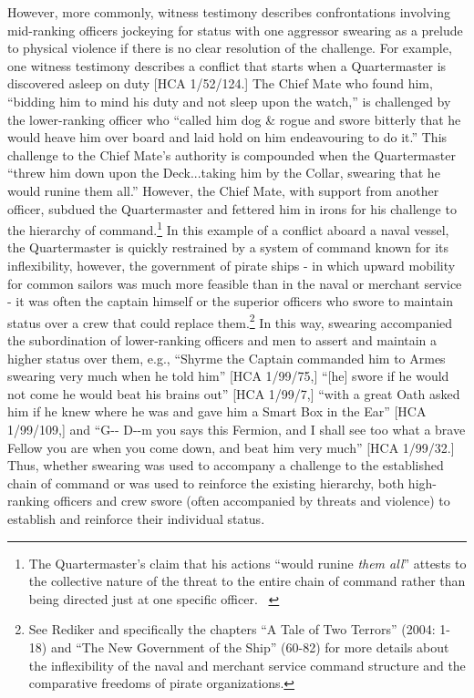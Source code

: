 \documentclass[12pt]{article}
\newcommand\textstyleoneclicklink[1]{#1}
\newenvironment{styleStandard}{\renewcommand\baselinestretch{1.0}\setlength\leftskip{0cm}\setlength\rightskip{0cm plus 1fil}\setlength\parindent{0cm}\setlength\parfillskip{0pt plus 1fil}\setlength\parskip{0in plus 1pt}\writerlistparindent\writerlistleftskip\leavevmode\normalfont\normalsize\writerlistlabel\ignorespaces}{\unskip\vspace{0in plus 1pt}\par}
\newcommand\writerlistleftskip{}
\newcommand\writerlistparindent{}
\newcommand\writerlistlabel{}
\begin{document}
\begin{styleStandard}
However, more commonly, witness testimony describes confrontations involving mid-ranking officers jockeying for status with one aggressor swearing as a prelude to physical violence if there is no clear resolution of the challenge. For example, one witness testimony describes a conflict that starts when a Quartermaster is discovered asleep on duty [HCA 1/52/124.] The Chief Mate who found him, “bidding him to mind his duty and not sleep upon the watch,” is challenged by the lower-ranking officer who “called him dog \& rogue and swore bitterly that he would heave him over board and laid hold on him endeavouring to do it.” This challenge to the Chief Mate’s authority is compounded when the Quartermaster “threw him down upon the Deck...taking him by the Collar, swearing that he would runine them all.” However, the Chief Mate, with support from another officer, subdued the Quartermaster and fettered him in irons for his challenge to the hierarchy of command.\footnote{ The Quartermaster’s claim that his actions “would runine \textit{them all}” attests to the collective nature of the threat to the entire chain of command rather than being directed just at one specific officer. \ } In this example of a conflict aboard a naval vessel, the Quartermaster is quickly restrained by a system of command known for its inflexibility, however, the government of pirate ships - in which upward mobility for common sailors was much more feasible than in the naval or merchant service - it was often the captain himself or the superior officers who swore to maintain status over a crew that could replace them.\footnote{ See Rediker and specifically the chapters “A Tale of Two Terrors” (2004: 1-18) and “The New Government of the Ship” (60-82) for more details about the inflexibility of the naval and merchant service command structure and the comparative freedoms of pirate organizations. \par } In this way, swearing accompanied the subordination of lower-ranking officers and men to assert and maintain a higher status over them, e.g., “Shyrme the Captain commanded him to Armes swearing very much when he told him” [HCA 1/99/75,] “[he] swore if he would not come he would beat his brains out” [HCA 1/99/7,] “with a great Oath asked him if he knew where he was and gave him a Smart Box in the Ear” [HCA 1/99/109,] and “G-{}- D-{}-m you says this Fermion, and I shall see too what a brave Fellow you are when you come down, and beat him very much” [HCA 1/99/32.] Thus, whether swearing was used to accompany a challenge to the established chain of command or was used to reinforce the \textstyleoneclicklink{existing} \textstyleoneclicklink{hierarchy, both high-ranking officers and crew swore (often accompanied by threats and violence) to }establish and reinforce their individual status.
\end{styleStandard}
\end{document}
